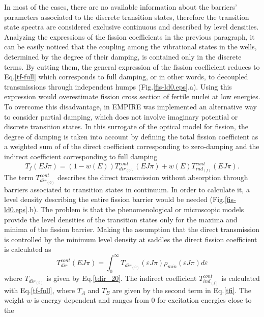 In most of the cases, there are no available information about the barriers'
parameters associated to the discrete transition states, therefore the
transition state spectra are considered exclusive continuous and described
by level densities. Analyzing the expressions of the fission coefficients in
the previous paragraph, it can be easily noticed that the coupling among the
vibrational states in the wells, determined by the degree of their damping,
is contained only in the discrete terms. By cutting them, the general
expression of the fission coefficient reduces to Eq.\ref{tf-full} which
corresponds to full damping, or in other words, to decoupled transmissions
through independent humps (Fig.\ref{fis-ld0.eps}.a). Using this expression
would overestimate fission cross section of fertile nuclei at low energies.
To overcome this disadvantage, in EMPIRE was implemented an alternative way
to consider partial damping, which does not involve imaginary potential or
discrete transition states. In this surrogate of the optical model for
fission, the degree of damping is taken into account by defining the total
fission coefficient as a weighted sum of of the direct coefficient
corresponding to zero-damping and the indirect coefficient corresponding to
full damping 
\begin{equation}
T_{f}(E J \pi)=(1-w(E))T_{dir_{(0)}}^{cont}(E J
\pi)+w(E)T_{ind_{(f)}}^{cont}(E J \pi).  \label{tfsurr}
\end{equation}
The term $T_{dir_{(0)}}^{cont}$ describes the direct transmission without
absorption through barriers associated to transition states in continuum. In
order to calculate it, a level density describing the entire fission barrier
would be needed (Fig.\ref{fis-ld0.eps}.b). The problem is that the
phenomenological or microscopic models provide the level densities of the
transition states only for the maxima and minima of the fission barrier.
Making the assumption that the direct transmission is controlled by the
minimum level density at saddles the direct fission coefficient is
calculated as 
\begin{equation}
T_{dir}^{cont}(EJ\pi)=\int_0^{\infty}T_{dir_{(0)}}(\varepsilon J
\pi)\rho_{min} (\varepsilon J \pi) d \varepsilon
\end{equation}
where $T_{dir_{(0)}}$ is given by Eq.\ref{tdir_20}. The indirect coefficient 
$T_{ind_{(f)}}^{cont}$ is calculated with Eq.\ref{tf-full}, where $T_A$ and $%
T_B$ are given by the second term in Eq.\ref{tfi}. The weight $w$ is
energy-dependent and ranges from 0 for excitation energies close to the
